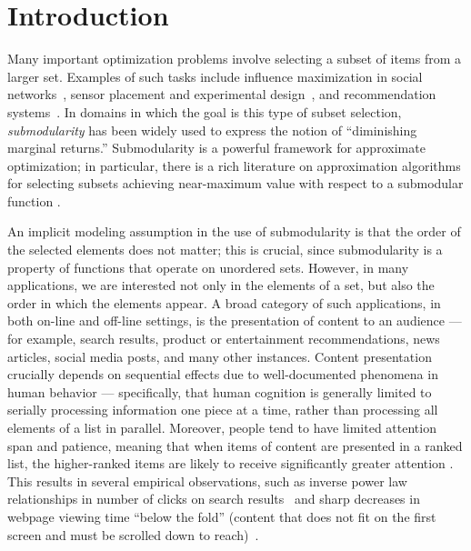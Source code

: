 
% 

\section{Introduction} \label{sec:intro}

Many important optimization problems involve selecting a subset
of items from a larger set. Examples of such tasks include influence
maximization in social networks~\cite{KKT03}, sensor placement and
experimental design~\cite{krause2008robust}, and recommendation
systems~\cite{Yue11, gabillon2013adaptive}. In domains in which the
goal is this type of subset selection,
\emph{submodularity} has been widely used to express the notion of
``diminishing marginal returns.'' Submodularity is a powerful
framework for approximate optimization; in particular, there is a rich
literature on approximation algorithms for selecting subsets 
achieving near-maximum value with respect to a submodular function
\cite{nemhauserwolseyfisher1978,
calinescu2011, filmus2013, vondrak2013, krause2014survey}.

An implicit modeling assumption in the use of submodularity is
that the order of the selected elements does not matter;
this is crucial, since submodularity is a property of functions
that operate on unordered sets.
However, in many applications, we are interested not only in the
elements of a set, but also the order in which the elements appear.
A broad category of such applications, in both on-line and off-line
settings, is the presentation of content to an audience ---
for example, search results, product or entertainment recommendations, 
news articles, social media posts, and many other instances.
Content presentation crucially depends on sequential effects 
due to well-documented phenomena in human behavior ---
specifically, that human cognition is generally limited to
serially processing information one piece at a time, rather than
processing all elements of a list in parallel. Moreover, people tend
to have limited attention span and patience, meaning that when
items of content are presented in a ranked list,
the higher-ranked items are likely to receive significantly greater attention
\cite{pan2007google}. This results in several empirical
observations, such as inverse power law relationships in number of
clicks on search results~\cite{williamsZipf} and sharp decreases in
webpage viewing time ``below the fold'' (content that does not fit on
the first screen and must be scrolled down to reach)~\cite{NNGfold}.

